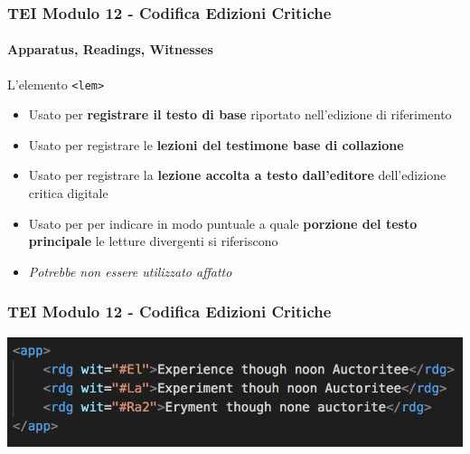 \begin{frame}
    \frametitle{TEI Modulo 12 - Codifica Edizioni Critiche}
    \framesubtitle{Apparatus, Readings, Witnesses}
    \addtocounter{nframe}{1}





    \begin{block}{L'elemento \texttt{<lem>}}
        
        \begin{itemize}
            \item Usato per \textbf{registrare il testo di base} riportato nell'edizione di riferimento
            \item Usato per registrare le \textbf{lezioni del testimone base di collazione}
            \item Usato per registrare la \textbf{lezione accolta a testo dall'editore} dell'edizione critica digitale
            \item Usato per per indicare in modo puntuale a quale \textbf{porzione del testo principale} le letture divergenti si riferiscono
            \item \textit{Potrebbe non essere utilizzato affatto}
        \end{itemize}

    \end{block}

\end{frame}

\begin{frame}
    \frametitle{TEI Modulo 12 - Codifica Edizioni Critiche}
    \addtocounter{nframe}{1}
    

    \begin{center}
        \includegraphics[width=.95\textwidth]{imgs/app-rdg.png}
    \end{center}

\end{frame}


